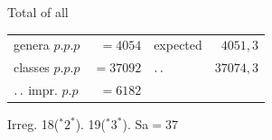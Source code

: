 \par\medskip\noindent Total of all
\begin{center}\begin{tabular}{@{}lrlr@{}}
genera $p.p.p$ & $=4054$ & expected & $4051{,}3$\\
classes $p.p.p$ & $=37092$ & $\mathinner{.\,.}$ & $37074{,}3$\\
$\mathinner{.\,.}$ impr. $p.p$ & $=6182$ & &\\
\end{tabular}\end{center}
\noindent Irreg. 18(${}^{*}2^{*}$). 19(${}^{*}3^{*}$). Sa$=37$
